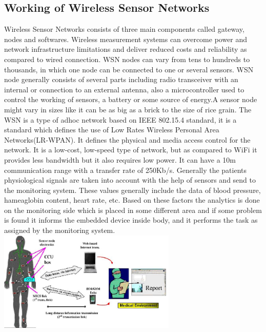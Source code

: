 \documentclass[conference]{IEEEtran}
\begin{document}
\subsection{Working of Wireless Sensor Networks}
Wireless Sensor Networks consists of three main components called gateway, nodes and softwares. Wireless measurement systems can overcome power and network infrastructure limitations and deliver reduced costs and reliability as compared to wired connection. WSN nodes can vary from tens to hundreds to thousands, in which one node can be connected to one or several sensors. WSN node generally consists of several parts including radio transceiver with an internal or connection to an external antenna, also a microcontroller used to control the working of sensors, a battery or some source of energy.A sensor node might vary in sizes like it can be as big as a brick to the size of rice grain.
\linebreak
\linebreak
The WSN is a type of adhoc network based on IEEE 802.15.4 standard, it is a standard which defines the use of Low Rates Wireless Personal Area Networks(LR-WPAN). It defines the physical and media access control for the network. It is a low-cost, low-speed type of network, but as compared to WiFi it provides less bandwidth but it also requires low power. It can have a 10m communication range with a transfer rate of 250Kb/s.
\linebreak
Generally the patients physiological signals are taken into account with the help of sensors and send to the monitoring system. These values generally include the data of blood pressure, hameaglobin content, heart rate, etc. Based on these factors the analytics is done on the monitoring side which is placed in some different area and if some problem is found it informs the embedded device inside body, and it performs the task as assigned by the monitoring system.
\linebreak
\linebreak
\linebreak
\includegraphics[width=8.5cm]{wsn}
\end{document}

